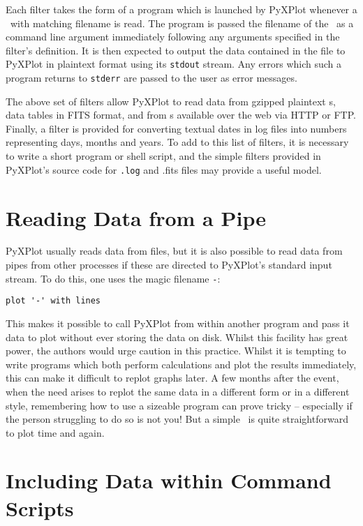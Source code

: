 Each filter takes the form of a program which is launched by PyXPlot whenever a
\datafile\ with matching filename is read. The program is passed the filename of
the \datafile\ as a command line argument immediately following any arguments
specified in the filter's definition. It is then expected to output the data
contained in the file to PyXPlot in plaintext format using its {\tt stdout}
stream. Any errors which such a program returns to {\tt stderr} are passed to
the user as error messages.

The above set of filters allow PyXPlot to read data from gzipped plaintext
\datafile s, data tables in FITS format, and from \datafile
s available over the web via HTTP or FTP. Finally, a
filter is provided for converting textual dates in log files into numbers
representing days, months and years. To add to this list of filters, it is
necessary to write a short program or shell script, and the simple filters
provided in PyXPlot's source code for {\tt .log} and {.fits} files may provide
a useful model.

\section{Reading Data from a Pipe}

PyXPlot usually reads data from files, but it is also possible to read data
from pipes from other processes if these are directed to PyXPlot's standard
input stream.  To do this, one uses the magic filename {\tt -}:

\begin{verbatim}
plot '-' with lines
\end{verbatim}

This makes it possible to call PyXPlot from within another program and pass it
data to plot without ever storing the data on disk. Whilst this facility has
great power, the authors would urge caution in this practice.  Whilst it is
tempting to write programs which both perform calculations and plot the results
immediately, this can make it difficult to replot graphs later. A few months
after the event, when the need arises to replot the same data in a different
form or in a different style, remembering how to use a sizeable program can
prove tricky -- especially if the person struggling to do so is not you! But a
simple \datafile\ is quite straightforward to plot time and again.

\section{Including Data within Command Scripts}

